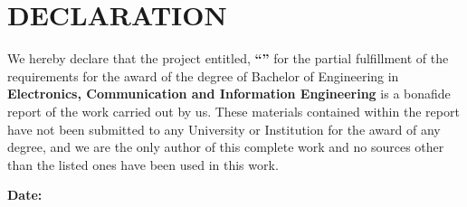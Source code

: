 \chapter*{DECLARATION}
{} %

\noindent We hereby declare that the project entitled, \textbf{``\cTitle''} for the partial fulfillment  of the requirements for the award of the degree of Bachelor of Engineering in \textbf{Electronics, Communication and Information Engineering} is a bonafide report of the work carried out by us. These materials contained within the report have not been submitted to any University or Institution for the award of any degree, and we are the only author of this complete work and no sources other than the listed ones have been used in this work.
\vspace{0.5cm}

\noindent \authorTable

\noindent \textbf{Date:} \cDate

